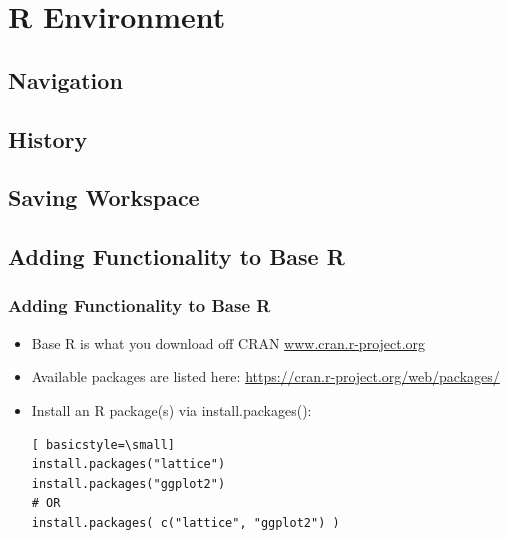 \section{R Environment}
\subsection{Navigation}
\begin{frame}
\end{frame}

\subsection{History}
\begin{frame}
\end{frame}

\subsection{Saving Workspace}
\begin{frame}
\end{frame}

\subsection{Adding Functionality to Base R}

\begin{frame}[fragile]
	\frametitle{Adding Functionality to Base R}

	\begin{itemize}
		\item Base R is what you download off CRAN \url{www.cran.r-project.org} 
		\item Available packages are listed here: \url{https://cran.r-project.org/web/packages/}
		\item Install an R package(s) via \ttfamily install.packages(): \normalfont 
   	\begin{lstlisting}[ basicstyle=\small]
install.packages("lattice")
install.packages("ggplot2")
# OR
install.packages( c("lattice", "ggplot2") )

	\end{lstlisting}
	\end{itemize} 	
\end{frame}



